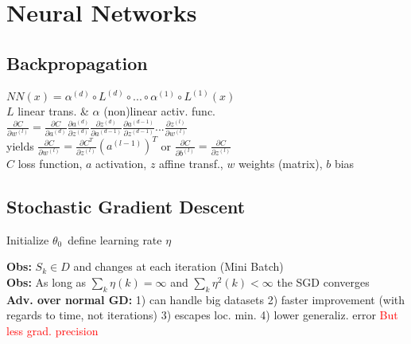 
\section{Neural Networks}
\subsection*{Backpropagation}
$NN(x) = \alpha^{(d)} \circ L^{(d)} \circ ... \circ \alpha^{(1)} \circ L^{(1)}(x)$ \\
$L$ linear trans. \& $\alpha$ (non)linear activ. func. \\
$\frac{\partial C}{\partial w^{(l)}} = \frac{\partial C}{\partial a^{(d)}} \frac{\partial a^{(d)}}{\partial z^{(d)}} \frac{\partial z^{(d)}}{\partial a^{(d-1)}}\frac{\partial a^{(d-1)}}{\partial z^{(d-1)}} ... \frac{\partial z^{(l)}}{\partial w^{(l)}}$ \\
yields $\frac{\partial C}{\partial w^{(l)}} = \frac{\partial C ^{T}}{\partial z^{(l)}} (a^{(l-1)})^T$ or $\frac{\partial C}{\partial b^{(l)}} = \frac{\partial C}{\partial z^{(l)}}$\\
$C$ loss function, $a$ activation, $z$ affine transf., $w$ weights (matrix), $b$ bias

\subsection*{Stochastic Gradient Descent}
\begin{algorithm}[H]
  Initialize $\theta_0$\, define learning rate $\eta$ \\
\end{algorithm}
    \textbf{Obs:} $S_k \in D$ and changes at each iteration (Mini Batch)  \\
    \textbf{Obs:} As long as $\sum_k \eta(k) = \infty$ and $\sum_k \eta^2(k) <  \infty$ the SGD converges\\  
    \textbf{Adv. over normal GD:} 1) can handle big datasets 2) faster improvement (with regards to time, not iterations) 3) escapes loc. min. 4) lower generaliz. error \textcolor{red}{But less grad. precision}